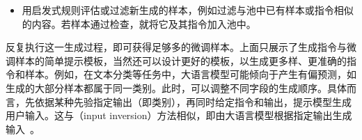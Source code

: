 \begin{itemize}
\begin{tcolorbox}
    \begingroup
    \setlength{\leftskip}{2em}
    \setlength{\rightskip}{2em}

    下面提供了一组输入输出样本，每个样本由一条指令、一个用户输入和一个输出组成。请以这些样本为基础，生成一个新样本。

    \vspace{0.2cm}

    样本 1：$\{*\mathrm{instruction}1*\}$

    \vspace{0.1cm}

    输入：$\{*\mathrm{user\text{-}input}1*\}$

    \vspace{0.1cm}

    输出：$\{*\mathrm{output}1*\}$

    \vspace{0.2cm}

    样本 2：$\{*\mathrm{instruction}2*\}$

    \vspace{0.1cm}

    输入：$\{*\mathrm{user\text{-}input}2*\}$

    \vspace{0.1cm}

    输出：$\{*\mathrm{output}2*\}$

    \vspace{0.2cm}

    新样本：$\{*\mathrm{new\text{-}instruction}*\}$

    \vspace{0.1cm}

    \underline{\hspace{2em}}

    \endgroup

    \end{tcolorbox}
    \vspace{0.5em}

\item \vspace{0.3em} 用启发式规则评估或过滤新生成的样本，例如过滤与池中已有样本或指令相似的内容。若样本通过检查，就将它及其指令加入池中。
\end{itemize}
\vspace{0.5em}

反复执行这一生成过程，即可获得足够多的微调样本。上面只展示了生成指令与微调样本的简单提示模板，当然还可以设计更好的模板，以生成更多样、更准确的指令和样本。例如，在文本分类等任务中，大语言模型可能倾向于产生有偏预测，如生成的大部分样本都属于同一类别。此时，可以调整不同字段的生成顺序。具体而言，先依据某种先验指定输出（即类别），再同时给定指令和输出，提示模型生成用户输入。这与（input inversion）方法相似，即由大语言模型根据指定输出生成输入~\cite{longpre-etal:2023flan}。

